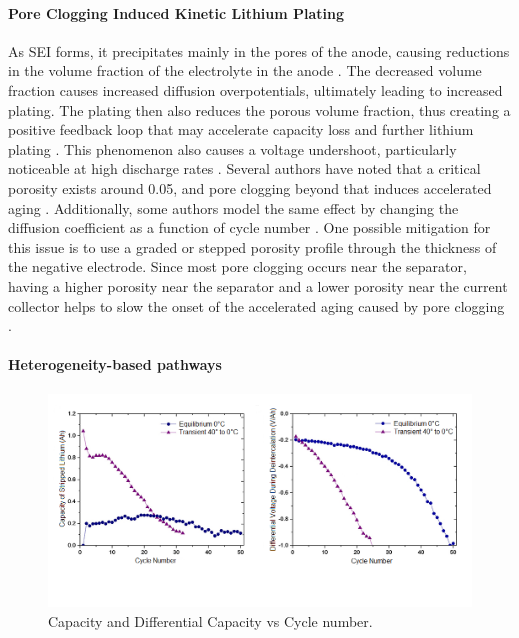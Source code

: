 \documentclass{article}
\newcommand{\pbox}[1]{{
\fbox{
\parbox{0.8\textwidth}{  \fbox{$\triangleright$\textcolor{blue}{\textbf{From Peter}:}} 
#1
}}}}
\begin{document}
\paragraph{Pore Clogging Induced Kinetic Lithium Plating}
As SEI forms, it precipitates mainly in the pores of the anode, causing reductions in the volume fraction of the electrolyte in the anode \cite{sikha_effect_2004}. The decreased volume fraction causes increased diffusion overpotentials, ultimately leading to increased plating. The plating then also reduces the porous volume fraction, thus creating a positive feedback loop that may accelerate capacity loss and further lithium plating \cite{yang_modeling_2017}. This phenomenon also causes a voltage undershoot, particularly noticeable at high discharge rates \cite{yang_modeling_2017}. Several authors have noted that a critical porosity exists around 0.05, and pore clogging beyond that induces accelerated aging \cite{yang_modeling_2017, muller_model-based_2019}. Additionally, some authors model the same effect by changing the diffusion coefficient as a function of cycle number \cite{keil_electrochemical_2020}. One possible mitigation for this issue is to use a graded or stepped porosity profile through the thickness of the negative electrode. Since most pore clogging occurs near the separator, having a higher porosity near the separator and a lower porosity near the current collector helps to slow the onset of the accelerated aging caused by pore clogging \cite{muller_model-based_2019}.


\paragraph{Heterogeneity-based pathways}
\pbox{
Ready to edit
}
\begin{figure}[ht]
\centering
\includegraphics[scale = 0.6]{images/Capacity & Diff Voltage.png}
\caption{Capacity and Differential Capacity vs Cycle number.}
\label{fig:CapDiffCapCycle}
\end{figure}
\end{document}
